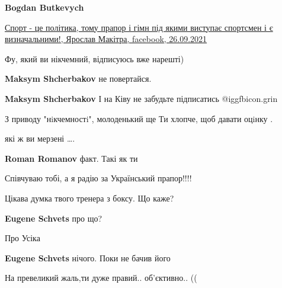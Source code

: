 \begin{itemize}
\begin{itemize}

\textbf{Bogdan Butkevych} 

\href{https://www.facebook.com/yaroslav.makitra/posts/4470921686327736}{%
Спорт - це політика, тому прапор і гімн під якими виступає спортсмен і є визначальними!, %
Ярослав Макітра, facebook, 26.09.2021%
}

\end{itemize} %


Фу, який ви нікчемний, відписуюсь вже нарешті)

\begin{itemize} %
\textbf{Maksym Shcherbakov} не повертайся.

\textbf{Maksym Shcherbakov} І на Ківу не забудьте підписатись  @igg{fbicon.grin} 

З приводу "нiкчемностi", молоденький ще Ти хлопче, щоб давати оцiнку .
\end{itemize} %


які ж ви мерзені ….

\begin{itemize} %
\textbf{Roman Romanov} факт. Такі як ти

Співчуваю тобі, а я радію за Український прапор!!!!
\end{itemize} %

Цікава думка твого тренера з боксу. Що каже?

\begin{itemize} %
\textbf{Eugene Schvets} про що?

Про Усіка


\textbf{Eugene Schvets} нічого. Поки не бачив його
\end{itemize} %

На превеликий жаль,ти дуже правий.. об'єктивно.. ((


\end{itemize}
